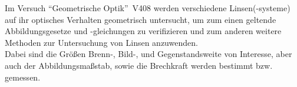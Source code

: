 Im Versuch \textquotedblleft Geometrische Optik\textquotedblright \, V408 werden verschiedene Linsen(-systeme) auf ihr optisches Verhalten geometrisch untersucht, um zum einen geltende Abbildungsgesetze und -gleichungen zu verifizieren und zum anderen weitere Methoden zur Untersuchung von Linsen anzuwenden.\\
Dabei sind die Größen Brenn-, Bild-, und Gegenstandsweite von Interesse, aber auch der Abbildungsmaßstab, sowie die Brechkraft werden bestimmt bzw. gemessen.
